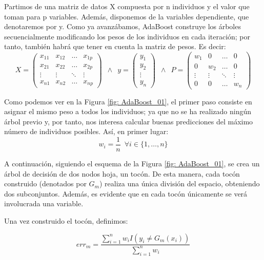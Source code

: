 \documentclass[12pt,twoside]{article}
\begin{document}
Partimos de una matriz de datos X compuesta por n individuos y el valor que toman para p variables. Además, disponemos de la variables dependiente, que denotaremos por y. Como ya avanzábamos, AdaBoost construye los árboles secuencialmente modificando los pesos de los individuos en cada iteración; por tanto, también habrá que tener en cuenta la matriz de pesos. Es decir:
\begin{equation*}
X =
\begin{pmatrix}
x_{11} & x_{12} & \dots & x_{1p} \\
x_{21} & x_{22} & \dots & x_{2p} \\
\vdots & \vdots & \ddots & \vdots \\
x_{n1} & x_{n2} & \dots & x_{np} 
\end{pmatrix}
\, \, \, 
\wedge
\, \, \,
y = 
\begin{pmatrix}
y_1 \\
y_2 \\
\vdots \\
y_n
\end{pmatrix}
\, \, \,
\wedge
\, \, \,
P =
\begin{pmatrix}
w_1 & 0 & \dots & 0 \\
0 & w_2 & \dots & 0 \\
\vdots & \vdots & \ddots & \vdots \\
0 & 0 & \dots & w_n
\end{pmatrix}
\end{equation*}

Como podemos ver en la Figura \ref{fig: AdaBoost_01}, el primer paso consiste en asignar el mismo peso a todos los individuos; ya que no se ha realizado ningún árbol previo y, por tanto, nos interesa calcular buenas predicciones del máximo número de individuos posibles. Así, en primer lugar:
\begin{equation*}
w_i = \frac{1}{n} \, \, \, \forall i \in \{1, \dots, n \}
\end{equation*}

A continuación, siguiendo el esquema de la Figura \ref{fig: AdaBoost_01}, se crea un árbol de decisión de dos nodos hoja, un tocón. De esta manera, cada tocón construido (denotados por $G_m$) realiza una única división del espacio, obteniendo dos subconjuntos. Además, es evidente que en cada tocón únicamente se verá involucrada una variable.

Una vez construido el tocón, definimos:

\begin{equation*}
err_m = \frac{\sum_{i=1}^{n} w_i I(y_i \neq G_m(x_i))}{\sum_{i=1}^{n} w_i} 
\end{equation*}
\end{document}
